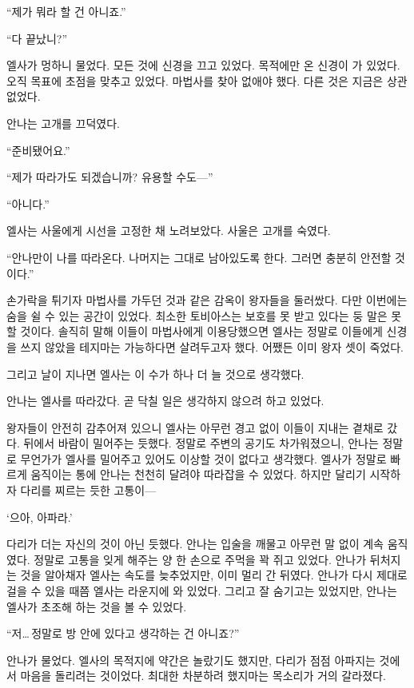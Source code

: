 ``제가 뭐라 할 건 아니죠.''

``다 끝났니?''

엘사가 멍하니 물었다. 모든 것에 신경을 끄고 있었다. 목적에만 온 신경이 가 있었다. 오직 목표에 초점을 맞추고 있었다. 마법사를 찾아 없애야 했다. 다른 것은 지금은 상관없었다.

안나는 고개를 끄덕였다.

``준비됐어요.''

``제가 따라가도 되겠습니까? 유용할 수도—''

``아니다.''

엘사는 사울에게 시선을 고정한 채 노려보았다. 사울은 고개를 숙였다.

``안나만이 나를 따라온다. 나머지는 그대로 남아있도록 한다. 그러면 충분히 안전할 것이다.''

손가락을 튀기자 마법사를 가두던 것과 같은 감옥이 왕자들을 둘러쌌다. 다만 이번에는 숨을 쉴 수 있는 공간이 있었다. 최소한 토비아스는 보호를 못 받고 있다는 둥 말은 못 할 것이다. 솔직히 말해 이들이 마법사에게 이용당했으면 엘사는 정말로 이들에게 신경을 쓰지 않았을 테지마는 가능하다면 살려두고자 했다. 어쨌든 이미 왕자 셋이 죽었다.

그리고 날이 지나면 엘사는 이 수가 하나 더 늘 것으로 생각했다.

\textbreak

안나는 엘사를 따라갔다. 곧 닥칠 일은 생각하지 않으려 하고 있었다.

왕자들이 안전히 감추어져 있으니 엘사는 아무런 경고 없이 이들이 지내는 곁채로 갔다. 뒤에서 바람이 밀어주는 듯했다. 정말로 주변의 공기도 차가워졌으니, 안나는 정말로 무언가가 엘사를 밀어주고 있어도 이상할 것이 없다고 생각했다. 엘사가 정말로 빠르게 움직이는 통에 안나는 천천히 달려야 따라잡을 수 있었다. 하지만 달리기 시작하자 다리를 찌르는 듯한 고통이—

`으아, 아파라.'

다리가 더는 자신의 것이 아닌 듯했다. 안나는 입술을 깨물고 아무런 말 없이 계속 움직였다. 정말로 고통을 잊게 해주는 양 한 손으로 주먹을 꽉 쥐고 있었다. 안나가 뒤처지는 것을 알아채자 엘사는 속도를 늦추었지만, 이미 멀리 간 뒤였다. 안나가 다시 제대로 걸을 수 있을 때쯤 엘사는 라운지에 와 있었다. 그리고 잘 숨기고는 있었지만, 안나는 엘사가 초조해 하는 것을 볼 수 있었다.

``저\ldots\,정말로 방 안에 있다고 생각하는 건 아니죠?''

안나가 물었다. 엘사의 목적지에 약간은 놀랐기도 했지만, 다리가 점점 아파지는 것에서 마음을 돌리려는 것이었다. 최대한 차분하려 했지마는 목소리가 거의 갈라졌다.

